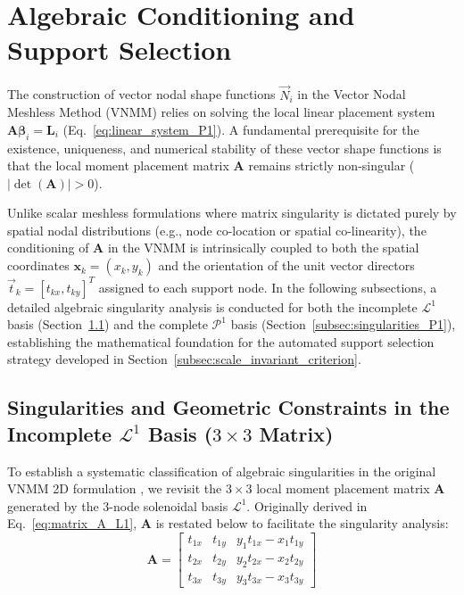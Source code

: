 \documentclass[preprint,12pt]{elsarticle}
\begin{document}
\section{Algebraic Conditioning and Support Selection}
\label{sec:conditioning}

The construction of vector nodal shape functions $\vec{N}_i$ in the Vector Nodal Meshless Method (VNMM) relies on solving the local linear placement system $\mathbf{A} \boldsymbol{\beta}_i = \mathbf{L}_i$ (Eq.~\eqref{eq:linear_system_P1}). A fundamental prerequisite for the existence, uniqueness, and numerical stability of these vector shape functions is that the local moment placement matrix $\mathbf{A}$ remains strictly non-singular ($|\det(\mathbf{A})| > 0$).

Unlike scalar meshless formulations where matrix singularity is dictated purely by spatial nodal distributions (e.g., node co-location or spatial co-linearity), the conditioning of $\mathbf{A}$ in the VNMM is intrinsically coupled to both the spatial coordinates $\mathbf{x}_k = (x_k, y_k)$ and the orientation of the unit vector directors $\vec{t}_k = [t_{kx}, t_{ky}]^T$ assigned to each support node. In the following subsections, a detailed algebraic singularity analysis is conducted for both the incomplete $\mathcal{L}^1$ basis (Section~\ref{subsec:singularities_L1}) and the complete $\mathcal{P}^1$ basis (Section~\ref{subsec:singularities_P1}), establishing the mathematical foundation for the automated support selection strategy developed in Section~\ref{subsec:scale_invariant_criterion}.


\subsection{Singularities and Geometric Constraints in the Incomplete \texorpdfstring{$\mathcal{L}^1$}{L1} Basis (\texorpdfstring{$3 \times 3$}{3x3} Matrix)}
\label{subsec:singularities_L1}

To establish a systematic classification of algebraic singularities in the original VNMM 2D formulation \cite{ortiz2021nodal, ortiz2023tese}, we revisit the $3 \times 3$ local moment placement matrix $\mathbf{A}$ generated by the 3-node solenoidal basis $\mathcal{L}^1$. Originally derived in Eq.~\eqref{eq:matrix_A_L1}, $\mathbf{A}$ is restated below to facilitate the singularity analysis:
\begin{equation}
    \mathbf{A} = \begin{bmatrix}
        t_{1x} & t_{1y} & y_1 t_{1x} - x_1 t_{1y} \\[4pt]
        t_{2x} & t_{2y} & y_2 t_{2x} - x_2 t_{2y} \\[4pt]
        t_{3x} & t_{3y} & y_3 t_{3x} - x_3 t_{3y}
    \end{bmatrix}
    \label{eq:matrix_A_L1_revisited}
\end{equation}
\end{document}
